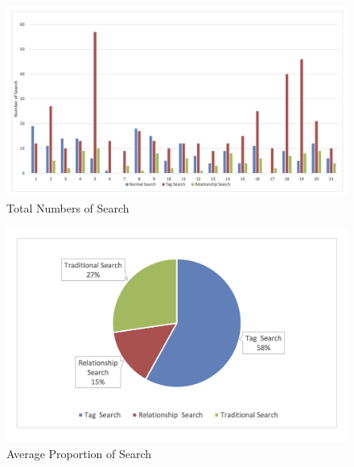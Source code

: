 \begin{figure}[!h]
\begin{centering}
\includegraphics[scale=0.7]{pics/search_total.png}
\caption{Total Numbers of Search}\label{fig:search_total}
\end{centering}
\end{figure}

\begin{figure}[!h]
\begin{centering}
\includegraphics[scale=0.68]{pics/search_percentage.png}
\caption{Average Proportion of Search}\label{fig:search_percentage}
\end{centering}
\end{figure}

